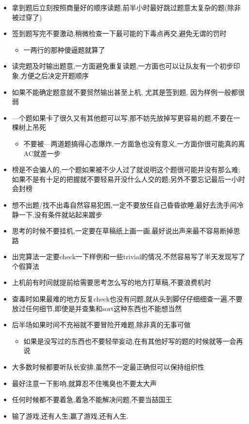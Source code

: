 \noindent
\begin{itemize}
	\item 拿到题后立刻按照商量好的顺序读题,前半小时最好跳过题意太复杂的题(除非被过穿了)
	
	\item 签到题写完不要激动,稍微检查一下最可能的下毒点再交,避免无谓的罚时
		\begin{itemize}
			\item 一两行的那种傻逼题就算了
		\end{itemize}
		
	\item 读完题及时输出题意,一方面避免重复读题,一方面也可以让队友有一个初步印象,方便之后决定开题顺序
	
	\item 如果不能确定题意就不要贸然输出甚至上机, 尤其是签到题, 因为样例一般都很弱
	
	\item —个题如果卡了很久又有其他题可以写,那不妨先放掉写更容易的题,不要在一棵树上吊死
		\begin{itemize}
			\item 不要被—两道题搞得心态爆炸,一方面急也没有意义,一方面你很可能真的离AC就差一步
		\end{itemize}
		
	\item 榜是不会骗人的,一个题如果被不少人过了就说明这个题很可能并没有那么难;如果不是有十足的把握就不要轻易开没什么人交的题;另外不要忘记最后一小时会封榜
	
	\item 想不出题/找不出毒自然容易犯困,一定不要放任自己昏昏欲睡,最好去洗手间冷静一下,没有条件就站起来踱步
	
	\item 思考的时候不要挂机,一定要在草稿纸上画一画,最好说出声来最不容易断掉思路
	
	\item 出完算法一定要check一下样例和一些trivial的情况,不然容易写了半天发现写了个假算法
	
	\item 上机前有时间就提前给需要思考怎么写的地方打草稿,不要浪费机时
	
	\item 查毒时如果最难的地方反复check也没有问题,就从头到脚仔仔细细查一遍,不要放过任何细节,即使是并查集和sort这种东西也不能想当然
	
	\item 后半场如果时间不充裕就不要冒险开难题,除非真的无事可做
		\begin{itemize}
			\item 如果是没写过的东西也不要轻举妄动,在有其他好写的题的时候就等一会再说
		\end{itemize}
		
	\item 大多数时候都要听队长安排,虽然不一定最正确但可以保持组织性
	
	\item 最好注意一下影响,就算忍不住嘴臭也不要太大声
	
	\item 任何时候都不要着急,着急不能解决问题,不要当喆国王
	
	\item 输了游戏,还有人生;赢了游戏,还有人生.
\end{itemize}